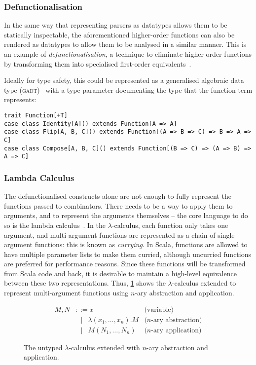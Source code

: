 \documentclass[../../main.tex]{subfiles}
\begin{document}
\subsubsection{Defunctionalisation}
In the same way that representing parsers as datatypes allows them to be statically inspectable, the aforementioned higher-order functions can also be rendered as datatypes to allow them to be analysed in a similar manner.
This is an example of \emph{defunctionalisation}, a technique to eliminate higher-order functions by transforming them into specialised first-order equivalents~\cite{reynolds_defunc_1972,danvy_defunctionalization_2001}.

Ideally for type safety, this could be represented as a generalised algebraic data type (\textsc{gadt})~\cite{cheney_gadt_2003} with a type parameter documenting the type that the function term represents:
\begin{verbatim}
trait Function[+T]
case class Identity[A]() extends Function[A => A]
case class Flip[A, B, C]() extends Function[(A => B => C) => B => A => C]
case class Compose[A, B, C]() extends Function[(B => C) => (A => B) => A => C]
\end{verbatim}

\subsubsection{Lambda Calculus}
The defunctionalised constructs alone are not enough to fully represent the functions passed to combinators.
There needs to be a way to apply them to arguments, and to represent the arguments themselves -- the core language to do so is the lambda calculus~\cite{church_lambda_1936}.
In the $\lambda$-calculus, each function only takes one argument, and multi-argument functions are represented as a chain of single-argument functions: this is known as \emph{currying}.
In Scala, functions are allowed to have multiple parameter lists to make them curried, although uncurried functions are preferred for performance reasons.
Since these functions will be transformed from Scala code and back, it is desirable to maintain a high-level equivalence between these two representations.
Thus, \cref{fig:lambda-calculus} shows the $\lambda$-calculus extended to represent multi-argument functions using $n$-ary abstraction and application.

\begin{figure}
\begin{align*}
M, N &\mathrel{::=} x & \text{(variable)} \\
&\mathrel{\enspace\mid\enspace} \lambda(x_1, \ldots, x_n).M & \text{($n$-ary abstraction)} \\
&\mathrel{\enspace\mid\enspace} M(N_1, \ldots, N_n) & \text{($n$-ary application)}
\end{align*}
\caption{The untyped $\lambda$-calculus extended with $n$-ary abstraction and application.}
\label{fig:lambda-calculus}
\end{figure}
\end{document}
